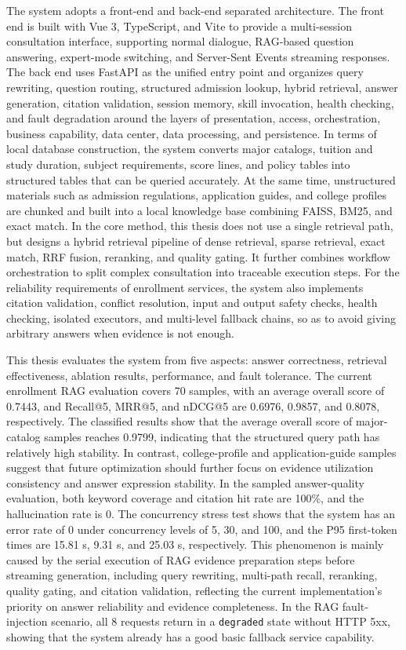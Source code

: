 \documentclass[UTF8,zihao=-4,oneside]{ctexbook}
\numberwithin{equation}{chapter}
\begin{document}
The system adopts a front-end and back-end separated architecture. The front end is built with Vue 3, TypeScript, and Vite to provide a multi-session consultation interface, supporting normal dialogue, RAG-based question answering, expert-mode switching, and Server-Sent Events streaming responses. The back end uses FastAPI as the unified entry point and organizes query rewriting, question routing, structured admission lookup, hybrid retrieval, answer generation, citation validation, session memory, skill invocation, health checking, and fault degradation around the layers of presentation, access, orchestration, business capability, data center, data processing, and persistence. In terms of local database construction, the system converts major catalogs, tuition and study duration, subject requirements, score lines, and policy tables into structured tables that can be queried accurately. At the same time, unstructured materials such as admission regulations, application guides, and college profiles are chunked and built into a local knowledge base combining FAISS, BM25, and exact match. In the core method, this thesis does not use a single retrieval path, but designs a hybrid retrieval pipeline of dense retrieval, sparse retrieval, exact match, RRF fusion, reranking, and quality gating. It further combines workflow orchestration to split complex consultation into traceable execution steps. For the reliability requirements of enrollment services, the system also implements citation validation, conflict resolution, input and output safety checks, health checking, isolated executors, and multi-level fallback chains, so as to avoid giving arbitrary answers when evidence is not enough.

This thesis evaluates the system from five aspects: answer correctness, retrieval effectiveness, ablation results, performance, and fault tolerance. The current enrollment RAG evaluation covers 70 samples, with an average overall score of 0.7443, and Recall@5, MRR@5, and nDCG@5 are 0.6976, 0.9857, and 0.8078, respectively. The classified results show that the average overall score of major-catalog samples reaches 0.9799, indicating that the structured query path has relatively high stability. In contrast, college-profile and application-guide samples suggest that future optimization should further focus on evidence utilization consistency and answer expression stability. In the sampled answer-quality evaluation, both keyword coverage and citation hit rate are 100\%, and the hallucination rate is 0. The concurrency stress test shows that the system has an error rate of 0 under concurrency levels of 5, 30, and 100, and the P95 first-token times are 15.81 s, 9.31 s, and 25.03 s, respectively. This phenomenon is mainly caused by the serial execution of RAG evidence preparation steps before streaming generation, including query rewriting, multi-path recall, reranking, quality gating, and citation validation, reflecting the current implementation's priority on answer reliability and evidence completeness. In the RAG fault-injection scenario, all 8 requests return in a \texttt{degraded} state without HTTP 5xx, showing that the system already has a good basic fallback service capability.
\end{document}
